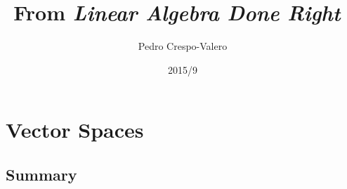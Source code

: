 \documentclass[11pt,notitlepage,oneside]{article}
\author{Pedro Crespo-Valero}
\begin{document}
\title{From \emph{Linear Algebra Done Right}~\cite{Axler1997}}
\date{2015/9}
\maketitle

\tableofcontents

\newpage
\setcounter{section}{0}
\section{Vector Spaces}
\subsection*{Summary}
\end{document}
